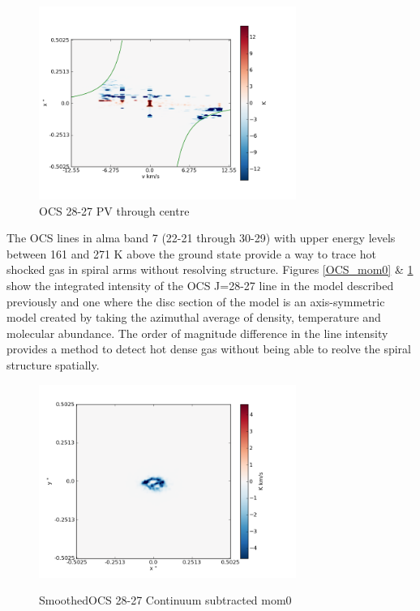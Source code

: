 \documentclass[useAMS,usenatbib]{mn2e}
\begin{document}
\begin{figure}[H]
 \includegraphics[width=84mm]{Figures/sim/imageOCS_28-27_30deg_composite_PV_centre.png}

 \caption{OCS 28-27 PV through centre}
\end{figure}

The OCS lines in alma band 7 (22-21 through 30-29) with upper energy levels between 161 and 271 K above the ground state provide a way to trace hot shocked gas in spiral arms without resolving structure. Figures \ref{OCS_mom0} \& \ref{smoothOCS_mom0} show the integrated intensity of the OCS J=28-27 line in the model described previously and one where the disc section of the model is an axis-symmetric model created by taking the azimuthal average of density, temperature and molecular abundance. The order of magnitude difference in the line intensity provides a method to detect hot dense gas without being able to reolve the spiral structure spatially.\newline

\begin{figure}
 \includegraphics[width=84mm]{Figures/sim/imagesmoothedOCS_28-27_30deg_contSub.png}
 \label{smoothOCS_mom0}
 \caption{SmoothedOCS 28-27 Continuum subtracted mom0}
\end{figure}
\end{document}
